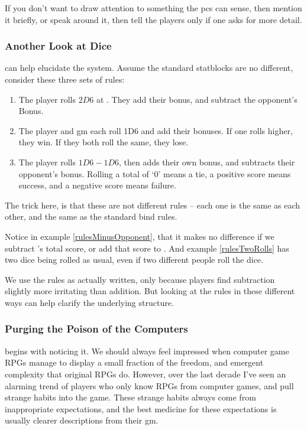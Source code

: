 \begin{multicols}{2}
If you don't want to draw attention to something the \glspl{pc} can sense, then mention it briefly, or speak around it, then tell the players only if one asks for more detail.

\subsubsection{Another Look at Dice}
can help elucidate the system.
Assume the standard statblocks are no different, consider these three sets of rules:

\begin{enumerate}
  \item
  The player rolls $2D6$ at \tn[7].
  They add their bonus, and subtract the opponent's Bonus.
  \label{rulesMinusOpponent}
  \item
  The player and \gls{gm} each roll 1D6 and add their bonuses.
  If one rolls higher, they win.
  If they both roll the same, they lose.
  \label{rulesTwoRolls}
  \item
  The player rolls $1D6-1D6$, then adds their own bonus, and subtracts their opponent's bonus.
  Rolling a total of `0' means a tie, a positive score means success, and a negative score means failure.
  \label{rulesMinusDie}
\end{enumerate}

The trick here, is that these are not different rules -- each one is the same as each other, and the same as the standard \gls{bind} rules.

Notice in example \ref{rulesMinusOpponent}, that it makes no difference if we subtract 's total score, or add that score to .
And example \ref{rulesTwoRolls} has two dice being rolled as usual, even if two different people roll the dice.

We use the rules as actually written, only because players find subtraction slightly more irritating than addition.
But looking at the rules in these different ways can help clarify the underlying structure.

\subsubsection{Purging the Poison of the Computers}
begins with noticing it.
We should always feel impressed when computer game RPGs manage to display a small fraction of the freedom, and emergent complexity that original RPGs do.
However, over the last decade I've seen an alarming trend of players who only know RPGs from computer games, and pull strange habits into the game.
These strange habits always come from inappropriate expectations, and the best medicine for these expectations is usually clearer descriptions from their \gls{gm}.


\end{multicols}
